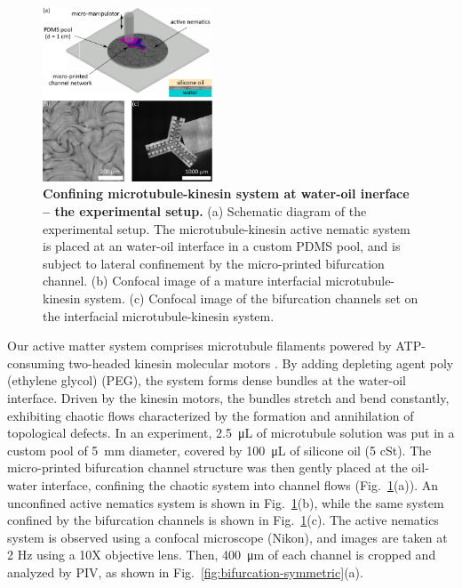 \documentclass[%
10pt,
superscriptaddress,
twocolumn,
 amsmath,amssymb,
 aps,prx,
]{revtex4-2}
\begin{document}
\begin{figure}[!h]
    \includegraphics[width=0.45\textwidth]{2-bifurcation-experiment}
    \caption{
    \textbf{Confining microtubule-kinesin system at water-oil inerface -- the experimental setup.}
    (a) Schematic diagram of the experimental setup. The microtubule-kinesin active nematic system is placed at an water-oil interface in a custom PDMS pool, and is subject to lateral confinement by the micro-printed bifurcation channel. 
    (b) Confocal image of a mature interfacial microtubule-kinesin system. 
    (c) Confocal image of the bifurcation channels set on the interfacial microtubule-kinesin system. 
    }
    \label{fig:bifurcation-experiment}
\end{figure}

Our active matter system comprises microtubule filaments powered by ATP-consuming two-headed kinesin molecular motors \cite{Sanchez2012}. 
By adding depleting agent poly (ethylene glycol) (PEG), the system forms dense bundles at the water-oil interface.
Driven by the kinesin motors, the bundles stretch and bend constantly, exhibiting chaotic flows characterized by the formation and annihilation of topological defects.
In an experiment, \SI{2.5}{\micro\liter} of microtubule solution was put in a custom pool of \SI{5}{\milli\meter} diameter, covered by \SI{100}{\micro\liter} of silicone oil (5 cSt).
The micro-printed bifurcation channel structure was then gently placed at the oil-water interface, confining the chaotic system into channel flows (Fig.~\ref{fig:bifurcation-experiment}(a)). 
An unconfined active nematics system is shown in Fig.~\ref{fig:bifurcation-experiment}(b), while the same system confined by the bifurcation channels is shown in Fig.~\ref{fig:bifurcation-experiment}(c).
The active nematics system is observed using a confocal microscope (Nikon), and images are taken at 2 Hz using a 10X objective lens.
Then, \SI{400}{\micro\meter} of each channel is cropped and analyzed by PIV, as shown in Fig.~\ref{fig:bifurcation-symmetric}(a).
\end{document}
